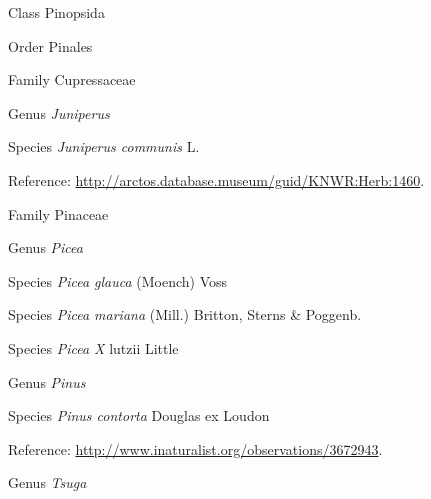 \documentclass[9pt, article]{memoir}
\begin{document}
\begin{multicols}{2}
\vspace{6pt}\noindent\hspace{12pt}Class Pinopsida


\vspace{6pt}\noindent\hspace{18pt}Order Pinales


\vspace{6pt}\noindent\hspace{24pt}Family Cupressaceae


\vspace{6pt}\noindent\hspace{30pt}Genus \textit{Juniperus}


\vspace{6pt}\noindent\hspace{36pt}Species \textit{Juniperus communis} L.


\vspace{6pt}Reference: 
\url{http://arctos.database.museum/guid/KNWR:Herb:1460}.

\vspace{6pt}\noindent\hspace{24pt}Family Pinaceae


\vspace{6pt}\noindent\hspace{30pt}Genus \textit{Picea}


\vspace{6pt}\noindent\hspace{36pt}Species \textit{Picea glauca} (Moench) Voss


\vspace{6pt}\noindent\hspace{36pt}Species \textit{Picea mariana} (Mill.) Britton, Sterns \& Poggenb.


\vspace{6pt}\noindent\hspace{36pt}Species \textit{Picea X} lutzii Little


\vspace{6pt}\noindent\hspace{30pt}Genus \textit{Pinus}


\vspace{6pt}\noindent\hspace{36pt}Species \textit{Pinus contorta} Douglas ex Loudon


\vspace{6pt}Reference: 
\url{http://www.inaturalist.org/observations/3672943}.

\vspace{6pt}\noindent\hspace{30pt}Genus \textit{Tsuga}



\end{multicols}
\end{document}
